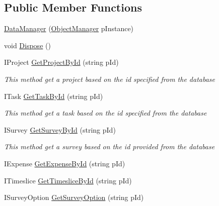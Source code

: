 \subsection*{Public Member Functions}
\begin{DoxyCompactItemize}
\item 
\hyperlink{class_plex_byte_1_1_mo_cap_1_1_managers_1_1_data_manager_acfc15879c5d4a6220e7290c7cc349d71}{Data\+Manager} (\hyperlink{class_plex_byte_1_1_mo_cap_1_1_managers_1_1_object_manager}{Object\+Manager} p\+Instance)
\item 
void \hyperlink{class_plex_byte_1_1_mo_cap_1_1_managers_1_1_data_manager_a4635dbd66ef17b1fe5ad4902263911b5}{Dispose} ()
\item 
I\+Project \hyperlink{class_plex_byte_1_1_mo_cap_1_1_managers_1_1_data_manager_a171f351a560808acdbf1dcff3dba35f0}{Get\+Project\+By\+Id} (string p\+Id)
\begin{DoxyCompactList}\small\item\em This method get a project based on the id specified from the database \end{DoxyCompactList}\item 
I\+Task \hyperlink{class_plex_byte_1_1_mo_cap_1_1_managers_1_1_data_manager_acc0b266b7b8314a706388937e9bfdfd0}{Get\+Task\+By\+Id} (string p\+Id)
\begin{DoxyCompactList}\small\item\em This method get a task based on the id specified from the database \end{DoxyCompactList}\item 
I\+Survey \hyperlink{class_plex_byte_1_1_mo_cap_1_1_managers_1_1_data_manager_ae241e73ab8bd473ed38bf4cea886daf8}{Get\+Survey\+By\+Id} (string p\+Id)
\begin{DoxyCompactList}\small\item\em This method get a survey based on the id provided from the database \end{DoxyCompactList}\item 
I\+Expense \hyperlink{class_plex_byte_1_1_mo_cap_1_1_managers_1_1_data_manager_a2d45292a0c90c2477132114a23916e5d}{Get\+Expense\+By\+Id} (string p\+Id)
\item 
I\+Timeslice \hyperlink{class_plex_byte_1_1_mo_cap_1_1_managers_1_1_data_manager_a3066dbd18dbfcd18e0920de4e37ae6f4}{Get\+Timeslice\+By\+Id} (string p\+Id)
\item 
I\+Survey\+Option \hyperlink{class_plex_byte_1_1_mo_cap_1_1_managers_1_1_data_manager_a270db5dc5377a18d97e04ff83841d6a0}{Get\+Survey\+Option} (string p\+Id)

\end{DoxyCompactItemize}

